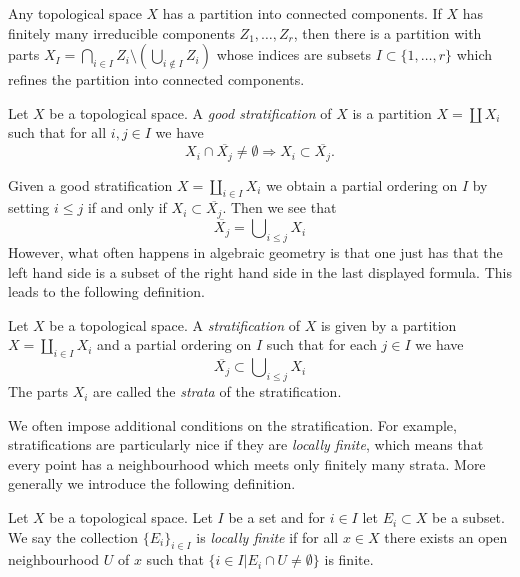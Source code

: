 \noindent
Any topological space $X$ has a partition into connected components.
If $X$ has finitely many irreducible components $Z_1, \ldots, Z_r$,
then there is a partition with parts
$X_I = \bigcap_{i \in I} Z_i \setminus (\bigcup_{i \not \in I} Z_i)$
whose indices are subsets $I \subset \{1, \ldots, r\}$
which refines the partition into connected components.

\begin{definition}
\label{definition-good-stratification}
Let $X$ be a topological space. A {\it good stratification}
of $X$ is a partition $X = \coprod X_i$ such that for all
$i, j \in I$ we have
$$
X_i \cap \overline{X_j} \not = \emptyset
\Rightarrow
X_i \subset \overline{X_j}.
$$
\end{definition}

\noindent
Given a good stratification $X = \coprod_{i \in I} X_i$ we obtain
a partial ordering on $I$ by setting $i \leq j$ if and only if
$X_i \subset \overline{X_j}$. Then we see that
$$
\overline{X_j} = \bigcup\nolimits_{i \leq j} X_i
$$
However, what often happens in algebraic geometry is that one just
has that the left hand side is a subset of the right hand side in
the last displayed formula. This leads to the following definition.

\begin{definition}
\label{definition-stratification}
Let $X$ be a topological space. A {\it stratification} of $X$ is
given by a partition $X = \coprod_{i \in I} X_i$ and a partial ordering
on $I$ such that for each $j \in I$ we have
$$
\overline{X_j} \subset \bigcup\nolimits_{i \leq j} X_i
$$
The parts $X_i$ are called the {\it strata} of the stratification.
\end{definition}

\noindent
We often impose additional conditions on the stratification.
For example, stratifications are particularly nice if they
are {\it locally finite}, which means that every point has a
neighbourhood which meets only finitely many strata. More generally
we introduce the following definition.

\begin{definition}
\label{definition-locally-finite}
Let $X$ be a topological space. Let $I$ be a set and for $i \in I$
let $E_i \subset X$ be a subset. We say the collection $\{E_i\}_{i \in I}$
is {\it locally finite} if for all $x \in X$ there exists an open
neighbourhood $U$ of $x$ such that
$\{i \in I | E_i \cap U \not = \emptyset\}$ is finite.
\end{definition}


